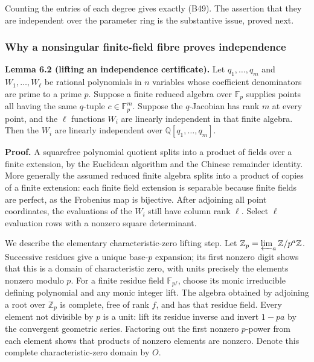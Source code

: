 \documentclass[
]{article}
\begin{document}
Counting the entries of each degree gives exactly (B49). The assertion
that they are independent over the parameter ring is the substantive
issue, proved next.

\subsubsection{Why a nonsingular finite-field fibre proves
independence}\label{why-a-nonsingular-finite-field-fibre-proves-independence}

\protect{}\label{lemma-6-2}{}

\textbf{Lemma 6.2 (lifting an independence certificate).} Let
\(q_1,\ldots,q_m\) and \(W_1,\ldots,W_\ell\) be rational polynomials in
\(n\) variables whose coefficient denominators are prime to a prime
\(p\). Suppose a finite reduced algebra over \(\mathbb F_p\) supplies
points all having the same \(q\)-tuple \(c\in\mathbb F_p^m\). Suppose
the \(q\)-Jacobian has rank \(m\) at every point, and the \(\ell\)
functions \(W_i\) are linearly independent in that finite algebra. Then
the \(W_i\) are linearly independent over
\(\mathbb Q [q_1,\ldots,q_m]\).

\textbf{Proof.} A squarefree polynomial quotient splits into a product
of fields over a finite extension, by the Euclidean algorithm and the
Chinese remainder identity. More generally the assumed reduced finite
algebra splits into a product of copies of a finite extension: each
finite field extension is separable because finite fields are perfect,
as the Frobenius map is bijective. After adjoining all point
coordinates, the evaluations of the \(W_i\) still have column rank
\(\ell\). Select \(\ell\) evaluation rows with a nonzero square
determinant.

We describe the elementary characteristic-zero lifting step. Let
\(\mathbb Z_p=\varprojlim_a\mathbb Z/p^a\mathbb Z\). Successive residues
give a unique base-\(p\) expansion; its first nonzero digit shows that
this is a domain of characteristic zero, with units precisely the
elements nonzero modulo \(p\). For a finite residue field
\(\mathbb F_{p^f}\), choose its monic irreducible defining polynomial
and any monic integer lift. The algebra obtained by adjoining a root
over \(\mathbb Z_p\) is complete, free of rank \(f\), and has that
residue field. Every element not divisible by \(p\) is a unit: lift its
residue inverse and invert \(1-pa\) by the convergent geometric series.
Factoring out the first nonzero \(p\)-power from each element shows that
products of nonzero elements are nonzero. Denote this complete
characteristic-zero domain by \(O\).
\end{document}
